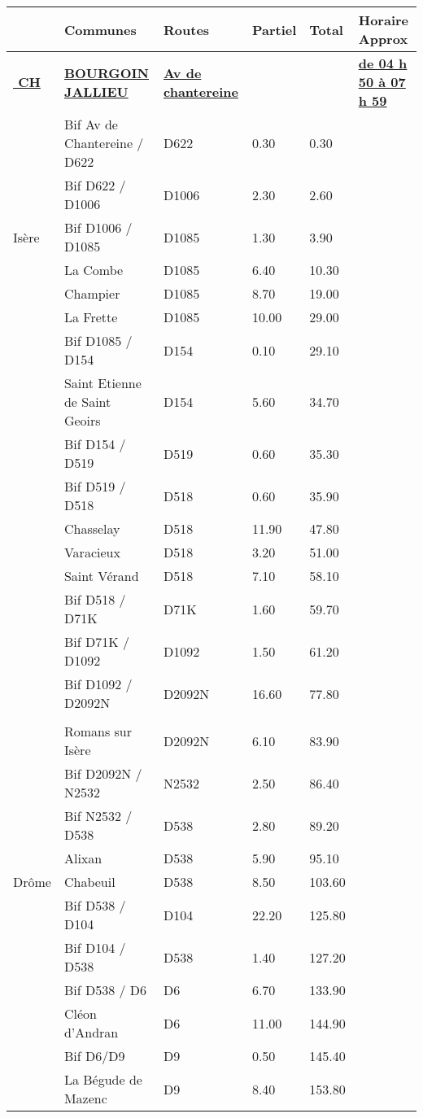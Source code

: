 \documentclass{article}%
\begin{document}
\begin{longtable}{p{2.25cm}|p{6.7cm}|p{2.0cm}|p{1.5cm}|p{1.5cm}|p{3.5cm}}%
\hline%
&Communes&Routes&Partiel&Total&Horaire Approx\\%
\hline%
\endhead%
\endfoot%
\endlastfoot%
\textbf{\underline{﻿                               CH }}&\textbf{\underline{BOURGOIN  JALLIEU}}&\textbf{\underline{Av de chantereine}}& & &\textbf{\underline{de 04 h 50 à 07 h 59}}\\%
 &Bif Av de Chantereine / D622&D622&0.30&0.30& \\%
 &Bif D622 / D1006&D1006&2.30&2.60& \\%
Isère&Bif D1006 / D1085&D1085&1.30&3.90& \\%
 &La Combe&D1085&6.40&10.30& \\%
 &Champier&D1085&8.70&19.00& \\%
 &La Frette&D1085&10.00&29.00& \\%
 &Bif D1085 / D154&D154&0.10&29.10& \\%
 &Saint Etienne de Saint Geoirs&D154&5.60&34.70& \\%
 &Bif D154 / D519&D519&0.60&35.30& \\%
 &Bif D519 / D518&D518&0.60&35.90& \\%
 &Chasselay&D518&11.90&47.80& \\%
 &Varacieux&D518&3.20&51.00& \\%
 &Saint Vérand&D518&7.10&58.10& \\%
 &Bif D518 / D71K&D71K&1.60&59.70& \\%
 &Bif D71K / D1092&D1092&1.50&61.20& \\%
 &Bif D1092 / D2092N&D2092N&16.60&77.80& \\%
\hline& & & & & \\%
 &Romans sur Isère&D2092N&6.10&83.90& \\%
 &Bif D2092N / N2532&N2532&2.50&86.40& \\%
 &Bif N2532 / D538&D538&2.80&89.20& \\%
 &Alixan&D538&5.90&95.10& \\%
Drôme&Chabeuil&D538&8.50&103.60& \\%
 &Bif D538 / D104&D104&22.20&125.80& \\%
 &Bif D104 / D538&D538&1.40&127.20& \\%
 &Bif D538 / D6&D6&6.70&133.90& \\%
 &Cléon d'Andran&D6&11.00&144.90& \\%
 &Bif D6/D9&D9&0.50&145.40& \\%
 &La Bégude de Mazenc&D9&8.40&153.80& \\%

\end{longtable}
\end{document}
